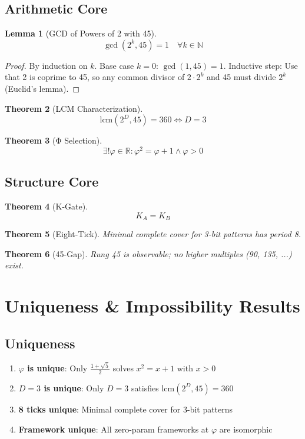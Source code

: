 \documentclass[11pt]{article}
\newtheorem{theorem}{Theorem}[section]
\newtheorem{lemma}[theorem]{Lemma}
\theoremstyle{definition}
\theoremstyle{remark}
\begin{document}
\subsection{Arithmetic Core}

\begin{lemma}[GCD of Powers of 2 with 45]
$$\gcd(2^k, 45) = 1 \quad \forall k \in \mathbb{N}$$
\end{lemma}

\begin{proof}
By induction on $k$. Base case $k=0$: $\gcd(1,45) = 1$. Inductive step: Use that 2 is coprime to 45, so any common divisor of $2 \cdot 2^k$ and 45 must divide $2^k$ (Euclid's lemma).
\end{proof}

\begin{theorem}[LCM Characterization]
$$\text{lcm}(2^D, 45) = 360 \iff D = 3$$
\end{theorem}

\begin{theorem}[Φ Selection]
$$\exists! \varphi \in \mathbb{R} : \varphi^2 = \varphi + 1 \land \varphi > 0$$
\end{theorem}

\subsection{Structure Core}

\begin{theorem}[K-Gate]
$$K_A = K_B$$
\end{theorem}

\begin{theorem}[Eight-Tick]
Minimal complete cover for 3-bit patterns has period 8.
\end{theorem}

\begin{theorem}[45-Gap]
Rung 45 is observable; no higher multiples (90, 135, ...) exist.
\end{theorem}

\section{Uniqueness \& Impossibility Results}

\subsection{Uniqueness}

\begin{enumerate}
\item \textbf{$\varphi$ is unique}: Only $\frac{1+\sqrt{5}}{2}$ solves $x^2 = x + 1$ with $x > 0$
\item \textbf{$D = 3$ is unique}: Only $D=3$ satisfies $\text{lcm}(2^D, 45) = 360$
\item \textbf{8 ticks unique}: Minimal complete cover for 3-bit patterns
\item \textbf{Framework unique}: All zero-param frameworks at $\varphi$ are isomorphic
\end{enumerate}
\end{document}
